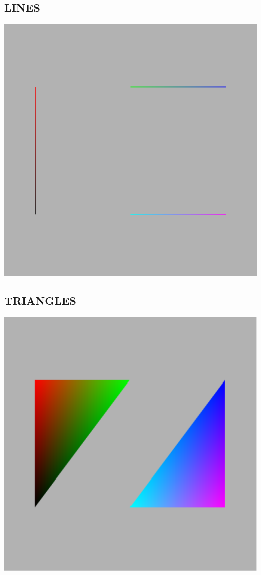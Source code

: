 \documentclass{report}
\begin{document}
\subsection{LINES}
\includegraphics[width=1.0\textwidth]{Image_4}
\subsection{TRIANGLES}
\includegraphics[width=1.0\textwidth]{Image_5}
\end{document}
